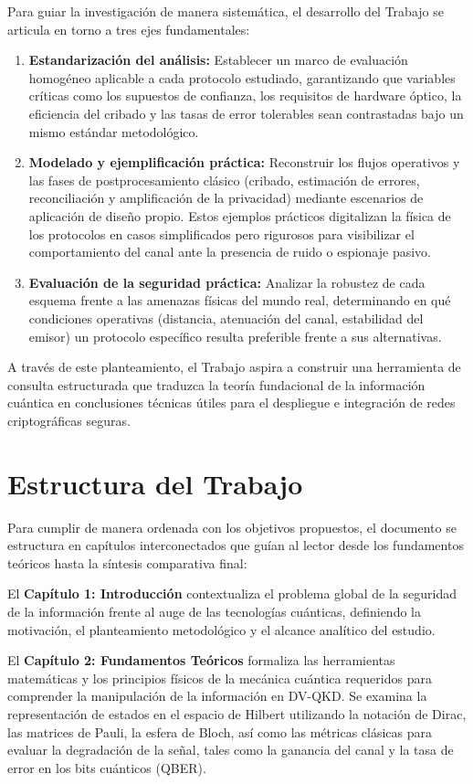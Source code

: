 Para guiar la investigación de manera sistemática, el desarrollo del Trabajo se articula en torno a tres ejes fundamentales:
\begin{enumerate}
    \item \textbf{Estandarización del análisis:} Establecer un marco de evaluación homogéneo aplicable a cada protocolo estudiado, garantizando que variables críticas como los supuestos de confianza, los requisitos de hardware óptico, la eficiencia del cribado y las tasas de error tolerables sean contrastadas bajo un mismo estándar metodológico.
    \item \textbf{Modelado y ejemplificación práctica:} Reconstruir los flujos operativos y las fases de postprocesamiento clásico (cribado, estimación de errores, reconciliación y amplificación de la privacidad) mediante escenarios de aplicación de diseño propio. Estos ejemplos prácticos digitalizan la física de los protocolos en casos simplificados pero rigurosos para visibilizar el comportamiento del canal ante la presencia de ruido o espionaje pasivo.
    \item \textbf{Evaluación de la seguridad práctica:} Analizar la robustez de cada esquema frente a las amenazas físicas del mundo real, determinando en qué condiciones operativas (distancia, atenuación del canal, estabilidad del emisor) un protocolo específico resulta preferible frente a sus alternativas.
\end{enumerate}

A través de este planteamiento, el Trabajo aspira a construir una herramienta de consulta estructurada que traduzca la teoría fundacional de la información cuántica en conclusiones técnicas útiles para el despliegue e integración de redes criptográficas seguras.

\section{Estructura del Trabajo}

Para cumplir de manera ordenada con los objetivos propuestos, el documento se estructura en capítulos interconectados que guían al lector desde los fundamentos teóricos hasta la síntesis comparativa final:

El \textbf{Capítulo 1: Introducción} contextualiza el problema global de la seguridad de la información frente al auge de las tecnologías cuánticas, definiendo la motivación, el planteamiento metodológico y el alcance analítico del estudio.

El \textbf{Capítulo 2: Fundamentos Teóricos} formaliza las herramientas matemáticas y los principios físicos de la mecánica cuántica requeridos para comprender la manipulación de la información en DV-QKD. Se examina la representación de estados en el espacio de Hilbert utilizando la notación de Dirac, las matrices de Pauli, la esfera de Bloch, así como las métricas clásicas para evaluar la degradación de la señal, tales como la ganancia del canal y la tasa de error en los bits cuánticos (QBER).

